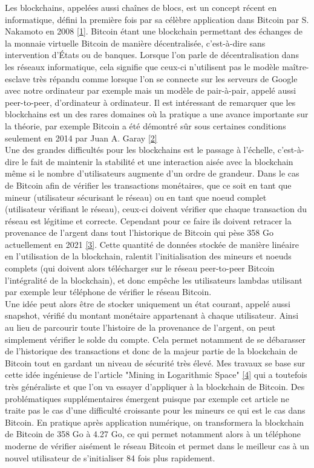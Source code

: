 \documentclass[12pt,a4paper]{article}
\newcommand{\source}[1]{\hyperlink{#1}{[#1]}}
\begin{document}
	Les blockchains, appelées aussi chaînes de blocs, est un concept récent en informatique, défini la première fois par sa célèbre application dans Bitcoin par S. Nakamoto en 2008 \source{1}. Bitcoin étant une blockchain permettant des échanges de la monnaie virtuelle Bitcoin de manière décentralisée, c'est-à-dire sans intervention d'États ou de banques. Lorsque l'on parle de décentralisation dans les réseaux informatique, cela signifie que ceux-ci n'utilisent pas le modèle maître-esclave très répandu comme lorsque l'on se connecte sur les serveurs de Google avec notre ordinateur par exemple mais un modèle de pair-à-pair, appelé aussi peer-to-peer, d'ordinateur à ordinateur. Il est intéressant de remarquer que les blockchains est un des rares domaines où la pratique a une avance importante sur la théorie, par exemple Bitcoin a été démontré sûr sous certaines conditions seulement en 2014 par Juan A. Garay \source{2}\\
	Une des grandes difficultés pour les blockchains est le passage à l'échelle, c'est-à-dire le fait de maintenir la stabilité et une interaction aisée avec la blockchain même si le nombre d'utilisateurs augmente d'un ordre de grandeur. Dans le cas de Bitcoin afin de vérifier les transactions monétaires, que ce soit en tant que mineur (utilisateur sécurisant le réseau) ou en tant que noeud complet (utilisateur vérifiant le réseau), ceux-ci doivent vérifier que chaque transaction du réseau est légitime et correcte. Cependant pour ce faire ils doivent retracer la provenance de l'argent dans tout l'historique de Bitcoin qui pèse 358 Go actuellement en 2021 \source{3}. Cette quantité de données stockée de manière linéaire en l'utilisation de la blockchain, ralentit l'initialisation des mineurs et noeuds complets (qui doivent alors télécharger sur le réseau peer-to-peer Bitcoin l'intégralité de la blockchain), et donc empêche les utilisateurs lambdas utilisant par exemple leur téléphone de vérifier le réseau Bitcoin.\\ %
	Une idée peut alors être de stocker uniquement un état courant, appelé aussi snapshot, vérifié du montant monétaire appartenant à chaque utilisateur. Ainsi au lieu de parcourir toute l'histoire de la provenance de l'argent, on peut simplement vérifier le solde du compte. Cela permet notamment de se débarasser de l'historique des transactions et donc de la majeur partie de la blockchain de Bitcoin tout en gardant un niveau de sécurité très élevé. Mes travaux se base sur cette idée ingénieuse de l'article "Mining in Logarithmic Space" \source{4} qui a toutefois très généraliste et que l'on va essayer d'appliquer à la blockchain de Bitcoin. Des problématiques supplémentaires émergent puisque par exemple cet article ne traite pas le cas d'une difficulté croissante pour les mineurs ce qui est le cas dans Bitcoin. En pratique après application numérique, on transformera la blockchain de Bitcoin de 358 Go à 4.27 Go, ce qui permet notamment alors à un téléphone moderne de vérifier aisément le réseau Bitcoin et permet dans le meilleur cas à un nouvel utilisateur de s'initialiser 84 fois plus rapidement.\\
\end{document}
